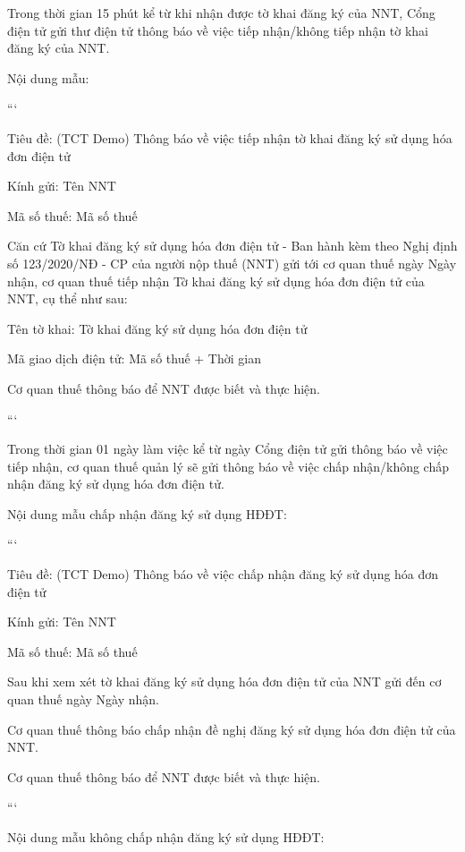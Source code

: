 

Trong thời gian 15 phút kể từ khi nhận được tờ khai đăng ký của NNT, Cổng điện tử gửi thư điện tử thông báo về việc tiếp nhận/không tiếp nhận tờ khai đăng ký của NNT.

Nội dung mẫu:

```

Tiêu đề: (TCT Demo) Thông báo về việc tiếp nhận tờ khai đăng ký sử dụng hóa đơn điện tử

Kính gửi: {{Tên NNT}}

Mã số thuế: {{Mã số thuế}}

Căn cứ Tờ khai đăng ký sử dụng hóa đơn điện tử - Ban hành kèm theo Nghị định số 123/2020/NĐ - CP của người nộp thuế (NNT) gửi tới cơ quan thuế ngày {{Ngày nhận}}, cơ quan thuế tiếp nhận Tờ khai đăng ký sử dụng hóa đơn điện tử của NNT, cụ thể như sau:

Tên tờ khai: Tờ khai đăng ký sử dụng hóa đơn điện tử

Mã giao dịch điện tử: {{Mã số thuế + Thời gian}}

Cơ quan thuế thông báo để NNT được biết và thực hiện.

```


Trong thời gian 01 ngày làm việc kể từ ngày Cổng điện tử gửi thông báo về việc tiếp nhận, cơ quan thuế quản lý sẽ gửi thông báo về việc chấp nhận/không chấp nhận đăng ký sử dụng hóa đơn điện tử.

Nội dung mẫu chấp nhận đăng ký sử dụng HĐĐT:

```

Tiêu đề: (TCT Demo) Thông báo về việc chấp nhận đăng ký sử dụng hóa đơn điện tử

Kính gửi: {{Tên NNT}}

Mã số thuế: {{Mã số thuế}}

Sau khi xem xét tờ khai đăng ký sử dụng hóa đơn điện tử của NNT gửi đến cơ quan thuế ngày {{Ngày nhận}}.

Cơ quan thuế thông báo chấp nhận đề nghị đăng ký sử dụng hóa đơn điện tử của NNT.

Cơ quan thuế thông báo để NNT được biết và thực hiện.

```

Nội dung mẫu không chấp nhận đăng ký sử dụng HĐĐT:

